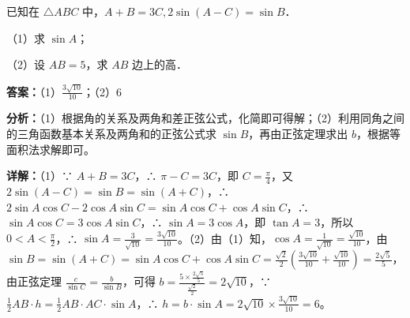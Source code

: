 \begin{question}[points=10]
已知在 $\triangle ABC$ 中，$A+B=3C, 2\sin(A-C)=\sin B$．

（1）求 $\sin A$；

（2）设 $AB=5$，求 $AB$ 边上的高．
\begin{solution}
\textbf{答案：}（1）$\frac{3\sqrt{10}}{10}$；（2）6

\textbf{分析：}（1）根据角的关系及两角和差正弦公式，化简即可得解；（2）利用同角之间的三角函数基本关系及两角和的正弦公式求 $\sin B$，再由正弦定理求出 $b$，根据等面积法求解即可。

\textbf{详解：}（1）∵ $A+B=3C$，∴ $\pi-C=3C$，即 $C=\frac{\pi}{4}$，又 $2\sin(A-C)=\sin B=\sin(A+C)$，∴ $2\sin A\cos C-2\cos A\sin C=\sin A\cos C+\cos A\sin C$，∴ $\sin A\cos C=3\cos A\sin C$，∴ $\sin A=3\cos A$，即 $\tan A=3$，所以 $0<A<\frac{\pi}{2}$，∴ $\sin A=\frac{3}{\sqrt{10}}=\frac{3\sqrt{10}}{10}$。（2）由（1）知，$\cos A=\frac{1}{\sqrt{10}}=\frac{\sqrt{10}}{10}$，由 $\sin B=\sin(A+C)=\sin A\cos C+\cos A\sin C=\frac{\sqrt{2}}{2}(\frac{3\sqrt{10}}{10}+\frac{\sqrt{10}}{10})=\frac{2\sqrt{5}}{5}$，由正弦定理 $\frac{c}{\sin C}=\frac{b}{\sin B}$，可得 $b=\frac{5\times\frac{2\sqrt{5}}{5}}{\frac{\sqrt{2}}{2}}=2\sqrt{10}$，∵ $\frac{1}{2}AB\cdot h=\frac{1}{2}AB\cdot AC\cdot\sin A$，∴ $h=b\cdot\sin A=2\sqrt{10}\times\frac{3\sqrt{10}}{10}=6$。
\end{solution}
\end{question}


